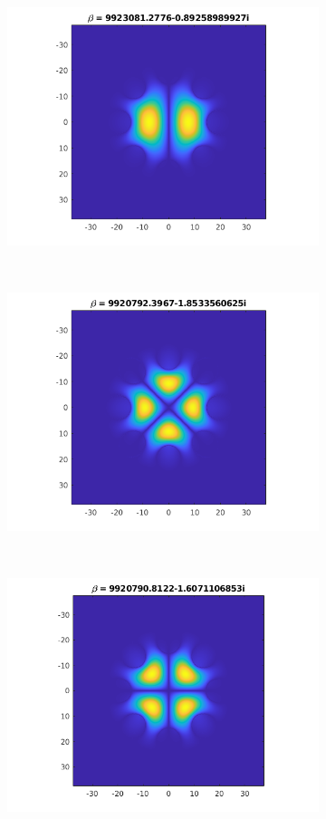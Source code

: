 \documentclass[]{article}
\begin{document}
\begin{figure}[htb]
\begin{subfigure}{0.3\textwidth}
		\includegraphics[width=\textwidth]{Figures/LP11b}
	\end{subfigure}
	\\
	\begin{subfigure}{0.3\textwidth}
		\includegraphics[width=\textwidth]{Figures/LP21a}
	\end{subfigure}
	~
	\begin{subfigure}{0.3\textwidth}
		\includegraphics[width=\textwidth]{Figures/LP21b}

\end{subfigure}
\end{figure}
\end{document}

